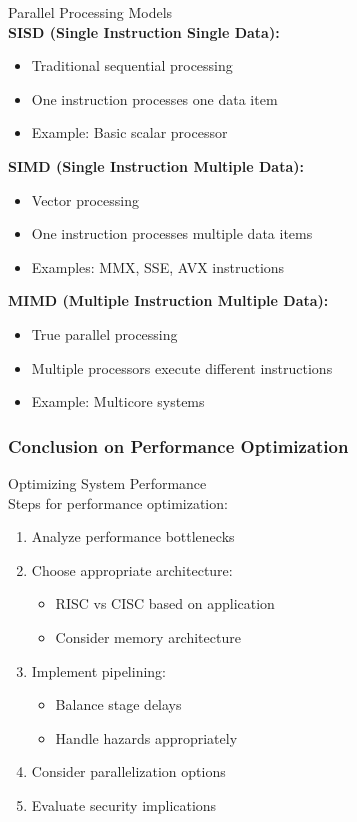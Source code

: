 \begin{concept}{Parallel Processing Models}\\
\textbf{SISD (Single Instruction Single Data):}
\begin{itemize}
  \item Traditional sequential processing
  \item One instruction processes one data item
  \item Example: Basic scalar processor
\end{itemize}

\textbf{SIMD (Single Instruction Multiple Data):}
\begin{itemize}
  \item Vector processing
  \item One instruction processes multiple data items
  \item Examples: MMX, SSE, AVX instructions
\end{itemize}

\textbf{MIMD (Multiple Instruction Multiple Data):}
\begin{itemize}
  \item True parallel processing
  \item Multiple processors execute different instructions
  \item Example: Multicore systems
\end{itemize}
\end{concept}

\subsubsection{Conclusion on Performance Optimization}

\begin{KR}{Optimizing System Performance}\\
Steps for performance optimization:
\begin{enumerate}
  \item Analyze performance bottlenecks
  \item Choose appropriate architecture:
    \begin{itemize}
      \item RISC vs CISC based on application
      \item Consider memory architecture
    \end{itemize}
  \item Implement pipelining:
    \begin{itemize}
      \item Balance stage delays
      \item Handle hazards appropriately
    \end{itemize}
  \item Consider parallelization options
  \item Evaluate security implications
\end{enumerate}
\end{KR}

